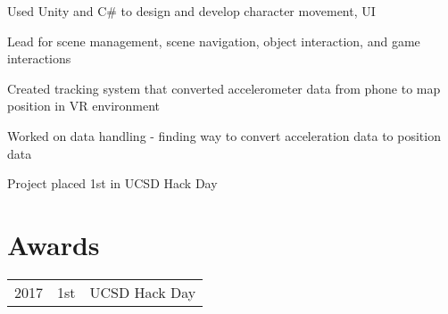 \documentclass[]{deedy-resume-openfont}
\begin{document}
\begin{minipage}[t]{0.66\textwidth}
\begin{tightemize} 
\item Used Unity and C\# to design and develop character movement, UI
\item Lead for scene management, scene navigation, object interaction, and game interactions
\end{tightemize}
\sectionsep

\begin{tightemize}
\item Created tracking system that converted accelerometer data from phone to map position in VR environment
\item Worked on data handling - finding way to convert acceleration data to position data
\item Project placed 1st in UCSD Hack Day
\end{tightemize}
\sectionsep


\section{Awards} 
\begin{tabular}{rll}
2017	     & 1st  & UCSD Hack Day\\
\end{tabular}
\sectionsep

\end{minipage} 
\end{document}
